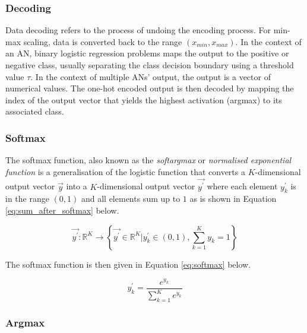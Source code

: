 \subsubsection{Decoding}\label{sec:anns:an:output:decoding}

Data decoding refers to the process of undoing the encoding process. For min-max scaling, data is converted back to the range $(x_{min}, x_{max})$. In the context of an \acs{AN}, binary logistic regression problems maps the output to the positive or negative class, usually separating the class decision boundary using a threshold value $\tau$. In the context of multiple \acp{AN}' output, the output is a vector of numerical values. The one-hot encoded output is then decoded by mapping the index of the output vector that yields the highest activation (argmax) to its associated class.

\subsubsection{Softmax}\label{sec:anns:an:output:softmax}

The softmax function, also known as the \textit{softargmax} \cite[p.~184]{ref:goodfellow:2016} or \textit{normalised exponential function} \cite{ref:bishop:2006} is a generalisation of the logistic function that converts a $K$-dimensional output vector $\vec{y}$ into a $K$-dimensional output vector $\vec{y^{'}}$ where each element $y^{'}_k$ is in the range $(0,1)$ and all elements sum up to $1$ as is shown in Equation \eqref{eq:sum_after_softmax} below.

\begin{equation}
    \vec{y^{'}} \colon \mathbb{R}^{K} \to \left\{\vec{y^{'}} \in \mathbb{R}^{K} \vert y^{'}_k \in (0,1), \sum_{k=1}^{K} y_k = 1\right\}
    \label{eq:sum_after_softmax}
\end{equation}

\noindent
The softmax function is then given in Equation \eqref{eq:softmax} below.

\begin{equation}
    y^{'}_k = \frac{e^{y_k}}{\sum_{k = 1}^{K}e^{y_k}}
    \label{eq:softmax}
\end{equation}


\subsubsection{Argmax}\label{sec:anns:an:output:argmax}

